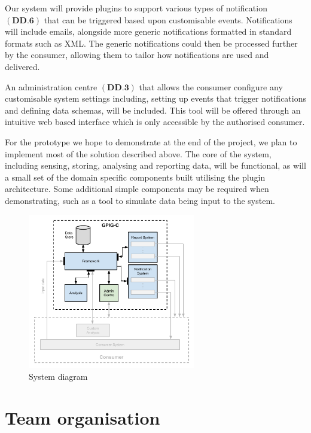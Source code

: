\documentclass[10pt,a4paper]{article}
\begin{document}
Our system will provide plugins to support various types of notification 
$(\textbf{DD.6})$ that can be triggered based upon customisable events. 
 Notifications will include emails, alongside more generic notifications formatted 
 in standard formats such as XML. The generic notifications 
 could then be processed further by the consumer, allowing them to tailor how 
 notifications are used and delivered. 

An administration centre $(\textbf{DD.3})$ that allows
the consumer configure any customisable system settings including, setting up
events that trigger notifications and defining data schemas, will be included. This tool 
will be offered through an intuitive web based interface which is only accessible by the
authorised consumer. 

For the prototype we hope to demonstrate at the end of the project, we plan to
implement most of the solution described above. The core of the system,
including sensing, storing, analysing and reporting data, will be functional,
as will a small set of the domain specific components built utilising the plugin 
architecture. Some additional simple components may be required when 
demonstrating, such as a tool to simulate data being input to the system. 



\begin{figure}[H]
	\centering
	\includegraphics[width=0.65\textwidth]{system-architecture.pdf}
	\caption{System diagram}
	\label{fig:systemDiagram}
\end{figure}


\section{Team organisation}
\end{document}
